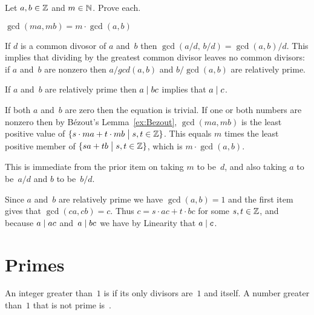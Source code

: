 \documentclass{ibl}
\begin{document}
\begin{bezoutproof}
\begin{ex}  \label{ex:EuclidsLemma}
Let $a,b\in\mathbb{Z}$ and $m\in\mathbb{N}$. 
Prove each.
\begin{exes}
\item $\gcd(ma,mb)=m\cdot\gcd(a,b)$
\item If $d$ is a common divosor of $a$ and~$b$ then 
  $\gcd(a/d,\,b/d)=\gcd(a,b)/d$.
  This implies that 
  dividing by the greatest common divisor leaves no common divisors:
  if $a$ and~$b$ are nonzero then $a/gcd(a,b)$ and $b/\gcd(a,b)$
  are relatively prime.
\item {}  
  If $a$ and~$b$ are relatively prime then $a\mid bc$ implies that 
  $a\mid c$.
\end{exes}
\begin{ans}
\begin{exes}
\item If both $a$ and~$b$ are zero then the equation is trivial.
  If one or both numbers are nonzero then by 
  B\'ezout's Lemma~\ref{ex:Bezout}, $\gcd(ma,mb)$ is the least
  positive value of $\{s\cdot ma+t\cdot mb \bigm| s,t\in\mathbb{Z}\}$.
  This equals $m$ times the least positive member of 
  $\{sa+tb \bigm| s,t\in\mathbb{Z}\}$, 
  which is $m\cdot\gcd(a,b)$.
\item This is immediate from the prior item on taking $m$ to be~$d$, 
  and also taking $a$ to be~$a/d$ and $b$ to be~$b/d$.     
\item Since $a$ and~$b$ are relatively prime we have $\gcd(a,b)=1$
  and the first item gives that $\gcd(ca,cb)=c$.
  Thus $c=s\cdot ac+t\cdot bc$ for some $s,t\in\mathbb{Z}$, and
  because $a\mid ac$ and~$a\mid bc$ we have by Linearity that
  $a\mid c$.
\end{exes}
\end{ans}
\end{ex}
\end{bezoutproof}











\section{Primes}
\begin{df}
An integer greater than~$1$
is  if its only divisors are~$1$ and itself.
A number greater than~$1$ that is not prime is~.  
\end{df}
\end{document}
